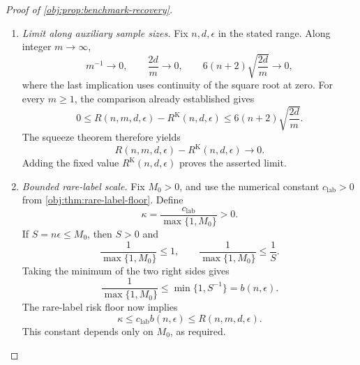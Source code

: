 \begin{proof}[Proof of \cref{obj:prop:benchmark-recovery}]
\begin{enumerate}
\item \emph{Limit along auxiliary sample sizes.}
Fix \(n,d,\epsilon\) in the stated range. Along integer \(m\to\infty\),
\[
m^{-1}\longrightarrow0,
\qquad
\frac{2d}{m}\longrightarrow0,
\qquad
6(n+2)\sqrt{\frac{2d}{m}}\longrightarrow0,
\]
where the last implication uses continuity of the square root at zero. For every \(m\ge1\), the comparison already established gives
\[
0\le R(n,m,d,\epsilon)-R^{\mathrm K}(n,d,\epsilon)
\le6(n+2)\sqrt{\frac{2d}{m}}.
\]
The squeeze theorem therefore yields
\[
R(n,m,d,\epsilon)-R^{\mathrm K}(n,d,\epsilon)\longrightarrow0.
\]
Adding the fixed value \(R^{\mathrm K}(n,d,\epsilon)\) proves the asserted limit.

\item \emph{Bounded rare-label scale.}
Fix \(M_0>0\), and use the numerical constant \(c_{\mathrm{lab}}>0\) from
\cref{obj:thm:rare-label-floor}. Define
\[
\kappa=\frac{c_{\mathrm{lab}}}{\max\{1,M_0\}}>0.
\]
If \(S=n\epsilon\le M_0\), then \(S>0\) and
\[
\frac1{\max\{1,M_0\}}\le1,
\qquad
\frac1{\max\{1,M_0\}}\le\frac1S.
\]
Taking the minimum of the two right sides gives
\[
\frac1{\max\{1,M_0\}}
\le\min\{1,S^{-1}\}=b(n,\epsilon).
\]
The rare-label risk floor now implies
\[
\kappa
\le c_{\mathrm{lab}}b(n,\epsilon)
\le R(n,m,d,\epsilon).
\]
This constant depends only on \(M_0\), as required.
\end{enumerate}
\end{proof}

